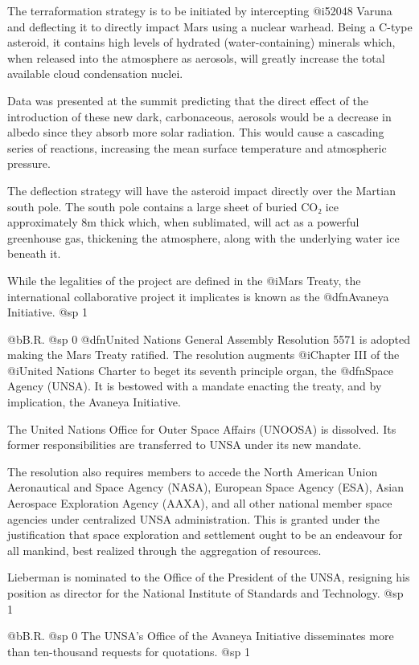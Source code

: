 The terraformation strategy is to be initiated by intercepting @i{52048 Varuna} and deflecting it to directly impact Mars using a nuclear warhead. Being a C-type asteroid, it contains high levels of hydrated (water-containing) minerals which, when released into the atmosphere as aerosols, will greatly increase the total available cloud condensation nuclei. 

Data was presented at the summit predicting that the direct effect of the introduction of these new dark, carbonaceous, aerosols would be a decrease in albedo since they absorb more solar radiation. This would cause a cascading series of reactions, increasing the mean surface temperature and atmospheric pressure.

The deflection strategy will have the asteroid impact directly over the Martian south pole. The south pole contains a large sheet of buried CO₂ ice approximately 8m thick which, when sublimated, will act as a powerful greenhouse gas, thickening the atmosphere, along with the underlying water ice beneath it.

While the legalities of the project are defined in the @i{Mars Treaty}, the international collaborative project it implicates is known as the @dfn{Avaneya Initiative}.
@sp 1

@b{B.R.}
@sp 0
@dfn{United Nations General Assembly Resolution 5571} is adopted making the Mars Treaty ratified. The resolution augments @i{Chapter III} of the @i{United Nations Charter} to beget its seventh principle organ, the @dfn{Space Agency} (UNSA). It is bestowed with a mandate enacting the treaty, and by implication, the Avaneya Initiative.

The United Nations Office for Outer Space Affairs (UNOOSA) is dissolved. Its former responsibilities are transferred to UNSA under its new mandate.

The resolution also requires members to accede the North American Union Aeronautical and Space Agency (NASA), European Space Agency (ESA), Asian Aerospace Exploration Agency (AAXA), and all other national member space agencies under centralized UNSA administration. This is granted under the justification that space exploration and settlement ought to be an endeavour for all mankind, best realized through the aggregation of resources.

Lieberman is nominated to the Office of the President of the UNSA, resigning his position as director for the National Institute of Standards and Technology.
@sp 1

@b{B.R.}
@sp 0
The UNSA's Office of the Avaneya Initiative disseminates more than ten-thousand requests for quotations.
@sp 1

